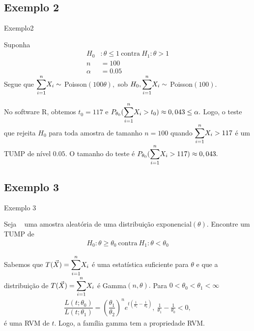 \documentclass[12pt]{beamer}
\begin{document}
\subsection{Exemplo 2}
\begin{frame}{Exemplo2}
\begin{block}{}
\justifying
Suponha 
\begin{align*}
    H_{0}&:\theta\leq 1~\text{contra}~H_{1}:\theta> 1\\
    n&=100\\
    \alpha&=0.05
\end{align*}
Segue que ${\displaystyle \sum_{i=1}^{n}} X_{i}\sim~$Poisson$(100\theta),$ sob $H_{0}, {\displaystyle \sum_{i=1}^{n}} X_{i}\sim~$Poisson$(100).$
\end{block}
\end{frame}

\begin{frame}{}
\begin{block}{}
\justifying
No software R, obtemos $t_{0}=117$ e $P_{\theta_{0}}({\displaystyle \sum_{i=1}^{n}} X_{i}>t_{0})\approx 0,043\leq \alpha.$ Logo, o teste que rejeita $H_{0}$ para toda amostra de tamanho $n=100$ quando ${\displaystyle \sum_{i=1}^{n}} X_{i}>117$ é um TUMP de nível $0.05.$ O tamanho do teste é $P_{\theta_{0}}({\displaystyle \sum_{i=1}^{n}} X_{i}>117)\approx 0,043.$
\end{block}
\end{frame}

\subsection{Exemplo 3}
\begin{frame}{Exemplo 3}
\begin{block}{}
\justifying
Seja \seqX~ uma amostra aleatória de uma distribuição exponencial$(\theta).$ Encontre um TUMP de 
\begin{align*}
    H_{0}:\theta\geq \theta_{0}~\text{contra}~H_{1}:\theta< \theta_{0}
\end{align*}
\end{block}
\pause
\begin{block}{}
\justifying
Sabemos que $T(\Vec{X})={\displaystyle \sum_{i=1}^{n}} X_{i}$ é uma estatística suficiente para $\theta$ e que a distribuição de $T(\Vec{X})={\displaystyle \sum_{i=1}^{n}} X_{i}$ é Gamma$(n,\theta).$ Para $0<\theta_{0}<\theta_{1}<\infty$
\begin{align*}
    \dfrac{L(t;\theta_{0})}{L(t;\theta_{1})}=\left(\dfrac{\theta_{1}}{\theta_{2}}\right)^{n}e^{t\left(\frac{1}{\theta_{1}}-\frac{1}{\theta_{0}}\right)},~\frac{1}{\theta_{1}}-\frac{1}{\theta_{0}}<0, 
\end{align*}
é uma RVM de $t.$ Logo, a família gamma tem a propriedade RVM. 
\end{block}
\end{frame}
\end{document}
